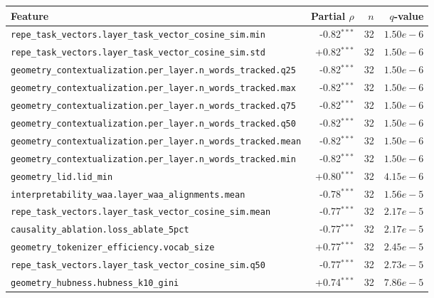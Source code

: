 \begin{tabular}{@{}lrrr@{}}
\toprule
\textbf{Feature} & \textbf{Partial $\rho$} & \textbf{$n$} & \textbf{$q$-value}\\
\midrule
\texttt{repe\_task\_vectors.layer\_task\_vector\_cosine\_sim.min} & -0.82$^{***}$ & 32 & $1.50e-6$ \\
\texttt{repe\_task\_vectors.layer\_task\_vector\_cosine\_sim.std} & +0.82$^{***}$ & 32 & $1.50e-6$ \\
\texttt{geometry\_contextualization.per\_layer.n\_words\_tracked.q25} & -0.82$^{***}$ & 32 & $1.50e-6$ \\
\texttt{geometry\_contextualization.per\_layer.n\_words\_tracked.max} & -0.82$^{***}$ & 32 & $1.50e-6$ \\
\texttt{geometry\_contextualization.per\_layer.n\_words\_tracked.q75} & -0.82$^{***}$ & 32 & $1.50e-6$ \\
\texttt{geometry\_contextualization.per\_layer.n\_words\_tracked.q50} & -0.82$^{***}$ & 32 & $1.50e-6$ \\
\texttt{geometry\_contextualization.per\_layer.n\_words\_tracked.mean} & -0.82$^{***}$ & 32 & $1.50e-6$ \\
\texttt{geometry\_contextualization.per\_layer.n\_words\_tracked.min} & -0.82$^{***}$ & 32 & $1.50e-6$ \\
\texttt{geometry\_lid.lid\_min} & +0.80$^{***}$ & 32 & $4.15e-6$ \\
\texttt{interpretability\_waa.layer\_waa\_alignments.mean} & -0.78$^{***}$ & 32 & $1.56e-5$ \\
\texttt{repe\_task\_vectors.layer\_task\_vector\_cosine\_sim.mean} & -0.77$^{***}$ & 32 & $2.17e-5$ \\
\texttt{causality\_ablation.loss\_ablate\_5pct} & -0.77$^{***}$ & 32 & $2.17e-5$ \\
\texttt{geometry\_tokenizer\_efficiency.vocab\_size} & +0.77$^{***}$ & 32 & $2.45e-5$ \\
\texttt{repe\_task\_vectors.layer\_task\_vector\_cosine\_sim.q50} & -0.77$^{***}$ & 32 & $2.73e-5$ \\
\texttt{geometry\_hubness.hubness\_k10\_gini} & +0.74$^{***}$ & 32 & $7.86e-5$ \\
\bottomrule
\end{tabular}